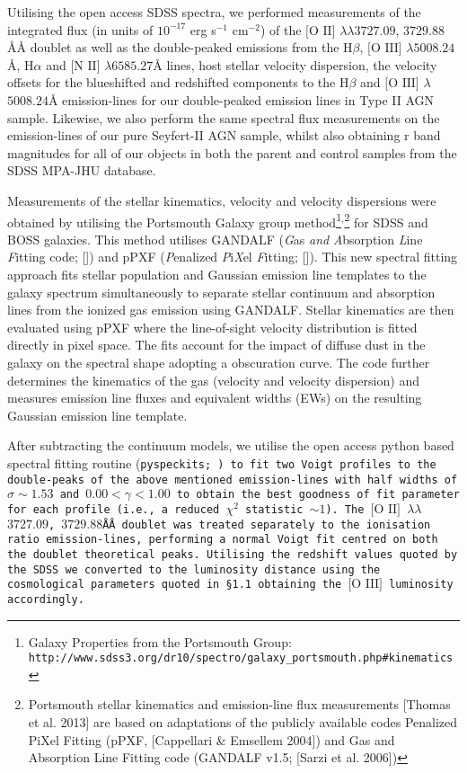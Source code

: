 Utilising the open access SDSS spectra, we performed measurements of the integrated flux (in units of $10^{-17}$ erg s$^{-1}$ cm$^{-2}$) of the $\text{[O II]}$ $\lambda\lambda$$3727.09$, $3729.88$\AA\AA{} doublet as well as the double-peaked emissions from the $\text{H}\beta$, $\text{[O III]}$ $\lambda$$5008.24$\AA{}, $\text{H}\alpha$ and $\text{[N II]}$ $\lambda$$6585.27$\AA{} lines, host stellar velocity dispersion, the velocity offsets for the blueshifted and redshifted components to the $\text{H}\beta$ and $\text{[O III]}$ $\lambda$$5008.24$\AA{} emission-lines for our double-peaked emission lines in Type II AGN sample. Likewise, we also perform the same spectral flux measurements on the emission-lines of our pure Seyfert-II AGN sample, whilst also obtaining r band magnitudes for all of our objects in both the parent and control samples from the SDSS MPA-JHU database. 

Measurements of the stellar kinematics, velocity and velocity dispersions were obtained by utilising the Portsmouth Galaxy group method\footnote{\tiny{Galaxy Properties from the Portsmouth Group: \tt{http://www.sdss3.org/dr10/spectro/galaxy_portsmouth.php#kinematics}}}$^{\text{,}}$\footnote{\tiny{Portsmouth stellar kinematics and emission-line flux measurements [Thomas et al. 2013] are based on adaptations of the publicly available codes Penalized PiXel Fitting (pPXF, [Cappellari \& Emsellem 2004]) and Gas and Absorption Line Fitting code (GANDALF v1.5; [Sarzi et al. 2006])}} for SDSS and BOSS galaxies. This method utilises GANDALF (\textit{G}as \textit{and} \textit{A}bsorption \textit{L}ine \textit{F}itting code; [\cite{Sarzi_2006}]) and pPXF (\textit{P}enalized \textit{P}i\textit{X}el \textit{F}itting; [\cite{2012ascl.soft10002C}]). This new spectral fitting approach fits stellar population and Gaussian emission line templates to the galaxy spectrum simultaneously to separate stellar continuum and absorption lines from the ionized gas emission using GANDALF. Stellar kinematics are then evaluated using pPXF where the line-of-sight velocity distribution is fitted directly in pixel space. The fits account for the impact of diffuse dust in the galaxy on the spectral shape adopting a \cite{Calzetti_2001} obscuration curve. The code further determines the kinematics of the gas (velocity and velocity dispersion) and measures emission line fluxes and equivalent widths (EWs) on the resulting Gaussian emission line template.

After subtracting the continuum models, we utilise the open access python based spectral fitting routine (\tt{pyspeckits}; \cite{2011ascl.soft09001G}) to fit two Voigt profiles to the double-peaks of the above mentioned emission-lines with half widths of $\sigma\sim{1.53}$ and ${0.00}<{\gamma}<{1.00}$ to obtain the best goodness of fit parameter for each profile (i.e., a reduced $\chi^{2}$ statistic $\sim{1}$). The $\text{[O II]}$ $\lambda\lambda$$3727.09$, $3729.88$\AA\AA{} doublet was treated separately to the ionisation ratio emission-lines, performing a normal Voigt fit centred on both the doublet theoretical peaks. Utilising the redshift values quoted by the SDSS we converted to the luminosity distance using the cosmological parameters quoted in §1.1 obtaining the $\text{[O III]}$ luminosity accordingly.
  
  
  
  
  